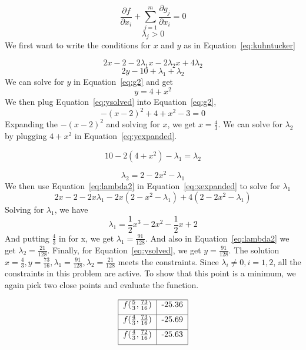 \documentclass[11pt]{scrartcl}
\begin{document}
\begin{equation}
	\label{eq:kuhntucker}
	\frac{\partial f}{\partial x_i} + \sum_{j=1}^{m}\frac{\partial g_j}{\partial x_i} = 0
\end{equation}
\begin{equation}
	\label{eq:kuhntucker2}
	\lambda_j > 0
\end{equation}
We first want to write the conditions for $x$ and $y$ as in 
Equation~\ref{eq:kuhntucker}

\begin{equation}
	\label{eq:xexpanded}
	2x -2 -2\lambda_1 x - 2\lambda_2 x + 4\lambda_2
\end{equation}
\begin{equation}
	\label{eq:yexpanded}
	2y -10 + \lambda_1 + \lambda_2
\end{equation}
We can solve for $y$ in Equation~\ref{eq:g2}
and get 
\begin{equation}
	\label{eq:ysolved}
	y = 4 + x^2
\end{equation}
We then plug Equation~\ref{eq:ysolved} into Equation~\ref{eq:g2},
\[-(x-2)^2 + 4 + x^2 -3 = 0\]
Expanding the $-(x-2)^2$ and solving for $x$, we get $x=\frac{4}{3}$.
We can solve for $\lambda_2$ by plugging $4+x^2$ in Equation~\ref{eq:yexpanded}.

\[10 - 2(4+x^2) - \lambda_1 = \lambda_2\]

\begin{equation}
	\label{eq:lambda2}
	\lambda_2 = 2 - 2x^2 -\lambda_1
\end{equation}
We then use Equation~\ref{eq:lambda2} in Equation~\ref{eq:xexpanded} to solve
for $\lambda_1$
\[2x - 2 -2x\lambda_1 - 2x(2-x^2-\lambda_1) +4(2-2x^2 -\lambda_1)\]
Solving for $\lambda_1$, we have 
\begin{equation}
	\label{eq:lambda1}
	\lambda_1 = \frac{1}{2}x^3 -2x^2 -\frac{1}{2}x + 2
\end{equation}
And putting $\frac{4}{3}$ in for x, we get $\lambda_1 = \frac{91}{128}$.
And also in Equation~\ref{eq:lambda2} we get $\lambda_2 = \frac{21}{128}$.
Finally, for Equation~\ref{eq:ysolved}, we get $y=\frac{91}{128}$.
The solution $x=\frac{4}{3}, y=\frac{73}{16}, \lambda_1 = \frac{91}{128},
\lambda_2 = \frac{21}{128}$ meets the constraints.
Since $\lambda_i \neq0, i=1, 2$, all the constraints in this problem are active.
To show that this point is a minimum, we again pick two close points and
evaluate the function.

\[
\begin{tabular}{|c|c|}
	\hline 
	$f(\frac{5}{3}, \frac{73}{16})$ & -25.36 \\ [.2cm]
	\hline 
	$f(\frac{4}{3}, \frac{73}{16})$ & -25.69 \\ [.2cm]
	\hline 
	$f(\frac{4}{3}, \frac{72}{16})$ & -25.63 \\ [.2cm]
	\hline
\end{tabular}
\]
\end{document}
